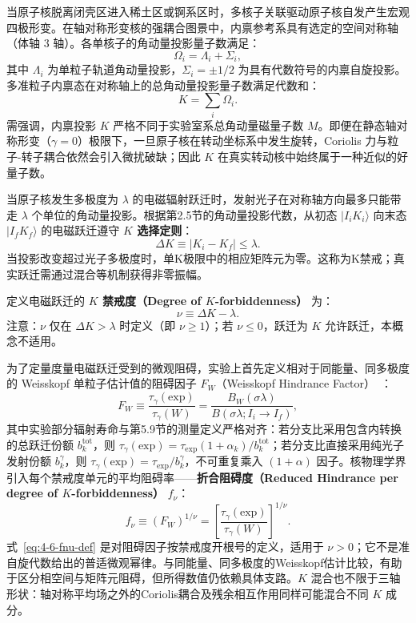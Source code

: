 当原子核脱离闭壳区进入稀土区或锕系区时，多核子关联驱动原子核自发产生宏观四极形变。在轴对称形变核的强耦合图景中，内禀参考系具有选定的空间对称轴（体轴 $3$ 轴）。各单核子的角动量投影量子数满足：
\begin{equation}\label{eq:4-6-omega-i-def}
\Omega_i = \Lambda_i + \Sigma_i,
\end{equation}
其中 $\Lambda_i$ 为单粒子轨道角动量投影，$\Sigma_i = \pm 1/2$ 为具有代数符号的内禀自旋投影。多准粒子内禀态在对称轴上的总角动量投影量子数满足代数和：
\begin{equation}\label{eq:4-6-K-def}
K = \sum_i \Omega_i.
\end{equation}
需强调，内禀投影 $K$ 严格不同于实验室系总角动量磁量子数 $M$。即便在静态轴对称形变（$\gamma = 0$）极限下，一旦原子核在转动坐标系中发生旋转，Coriolis 力与粒子-转子耦合依然会引入微扰破缺；因此 $K$ 在真实转动核中始终属于一种近似的好量子数。

当原子核发生多极度为 $\lambda$ 的电磁辐射跃迁时，发射光子在对称轴方向最多只能带走 $\lambda$ 个单位的角动量投影。根据第2.5节的角动量投影代数，从初态 $|I_i K_i\rangle$ 向末态 $|I_f K_f\rangle$ 的电磁跃迁遵守 \textbf{$K$ 选择定则}：
\begin{equation}\label{eq:4-6-K-selection-rule}
\Delta K \equiv |K_i - K_f| \le \lambda.
\end{equation}
当投影改变超过光子多极度时，单K极限中的相应矩阵元为零。这称为K禁戒；真实跃迁需通过混合等机制获得非零振幅。

定义电磁跃迁的 \textbf{$K$ 禁戒度（Degree of $K$-forbiddenness）} 为：
\begin{equation}\label{eq:4-6-forbiddenness-degree}
\nu \equiv \Delta K - \lambda.
\end{equation}
注意：$\nu$ 仅在 $\Delta K > \lambda$ 时定义（即 $\nu \ge 1$）；若 $\nu \le 0$，跃迁为 $K$ 允许跃迁，本概念不适用。

为了定量度量电磁跃迁受到的微观阻碍，实验上首先定义相对于同能量、同多极度的 Weisskopf 单粒子估计值的阻碍因子 $F_W$（Weisskopf Hindrance Factor）~\cite{book-jain-nuclear-isomers}：
\begin{equation}\label{eq:4-6-FW-def}
F_W \equiv \frac{\tau_\gamma(\mathrm{exp})}{\tau_\gamma(W)} = \frac{B_W(\sigma\lambda)}{B(\sigma\lambda; I_i \to I_f)},
\end{equation}
其中实验部分辐射寿命与第5.9节的测量定义严格对齐：若分支比采用包含内转换的总跃迁份额 $b_k^{\mathrm{tot}}$，则 $\tau_\gamma(\mathrm{exp}) = \tau_{\mathrm{exp}} (1 + \alpha_k) / b_k^{\mathrm{tot}}$；若分支比直接采用纯光子发射份额 $b_k^\gamma$，则 $\tau_\gamma(\mathrm{exp}) = \tau_{\mathrm{exp}} / b_k^\gamma$，不可重复乘入 $(1+\alpha)$ 因子。核物理学界引入每个禁戒度单元的平均阻碍率——\textbf{折合阻碍度（Reduced Hindrance per degree of $K$-forbiddenness）} $f_\nu$：
\begin{equation}\label{eq:4-6-fnu-def}
f_\nu \equiv (F_W)^{1/\nu} = \left[ \frac{\tau_\gamma(\mathrm{exp})}{\tau_\gamma(W)} \right]^{1/\nu}.
\end{equation}
式~\eqref{eq:4-6-fnu-def} 是对阻碍因子按禁戒度开根号的定义，适用于 $\nu>0$；它不是准自旋代数给出的普适微观幂律。与同能量、同多极度的Weisskopf估计比较，有助于区分相空间与矩阵元阻碍，但所得数值仍依赖具体支路。$K$ 混合也不限于三轴形状：轴对称平均场之外的Coriolis耦合及残余相互作用同样可能混合不同 $K$ 成分。

